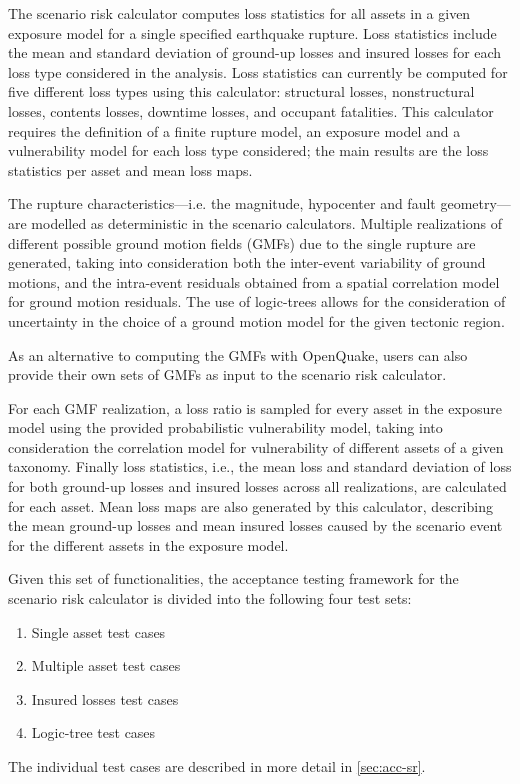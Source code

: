 The scenario risk calculator computes loss statistics for all assets in a given exposure model for a single specified earthquake rupture. Loss statistics include the mean and standard deviation of ground-up losses and insured losses for each loss type considered in the analysis. Loss statistics can currently be computed for five different loss types using this calculator: structural losses, nonstructural losses, contents losses, downtime losses, and occupant fatalities. This calculator requires the definition of a finite rupture model, an exposure model and a vulnerability model for each loss type considered; the main results are the loss statistics per asset and mean loss maps.

The rupture characteristics—i.e. the magnitude, hypocenter and fault geometry—are modelled as deterministic in the scenario calculators. Multiple realizations of different possible ground motion fields (GMFs) due to the single rupture are generated, taking into consideration both the inter-event variability of ground motions, and the intra-event residuals obtained from a spatial correlation model for ground motion residuals. The use of logic-trees allows for the consideration of uncertainty in the choice of a ground motion model for the given tectonic region.

As an alternative to computing the GMFs with OpenQuake, users can also provide their own sets of GMFs as input to the scenario risk calculator.

For each GMF realization, a loss ratio is sampled for every asset in the exposure model using the provided probabilistic vulnerability model, taking into consideration the correlation model for vulnerability of different assets of a given taxonomy. Finally loss statistics, i.e., the mean loss and standard deviation of loss for both ground-up losses and insured losses across all realizations, are calculated for each asset. Mean loss maps are also generated by this calculator, describing the mean ground-up losses and mean insured losses caused by the scenario event for the different assets in the exposure model.

Given this set of functionalities, the acceptance testing framework for the scenario risk calculator is divided into the following four test sets:

\begin{enumerate}
	\item Single asset test cases
	\item Multiple asset test cases
	\item Insured losses test cases
	\item Logic-tree test cases
\end{enumerate}

The individual test cases are described in more detail in \ref{sec:acc-sr}.
